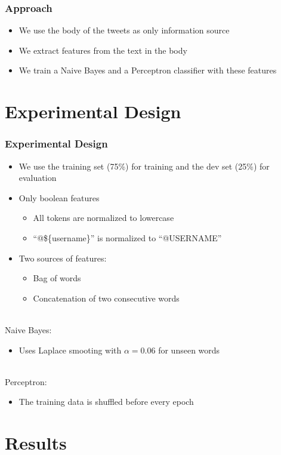 \documentclass[10pt,aspectratio=169]{beamer}
\begin{document}
\begin{frame}
  \frametitle{Approach}
  \begin{itemize}
    \item We use the body of the tweets as only information source
    \item We extract features from the text in the body
    \item We train a Naive Bayes and a Perceptron classifier with these features
  \end{itemize}
\end{frame}

\section{Experimental Design}

\begin{frame}
  \frametitle{Experimental Design}
  \begin{itemize}
    \item We use the training set (75\%) for training and the dev set (25\%) for evaluation
    \item Only boolean features
    \begin{itemize}
      \item All tokens are normalized to lowercase
      \item ``@\$\{username\}'' is normalized to ``@USERNAME''
    \end{itemize}
    \item Two sources of features:
    \begin{itemize}
      \item Bag of words
      \item Concatenation of two consecutive words
    \end{itemize} 
  \end{itemize}~\\
  Naive Bayes:
  \begin{itemize}
    \item Uses Laplace smooting with $\alpha=0.06$ for unseen words
  \end{itemize}~\\
  Perceptron:
  \begin{itemize}
    \item The training data is shuffled before every epoch
  \end{itemize}
\end{frame}

\section{Results}
\end{document}
